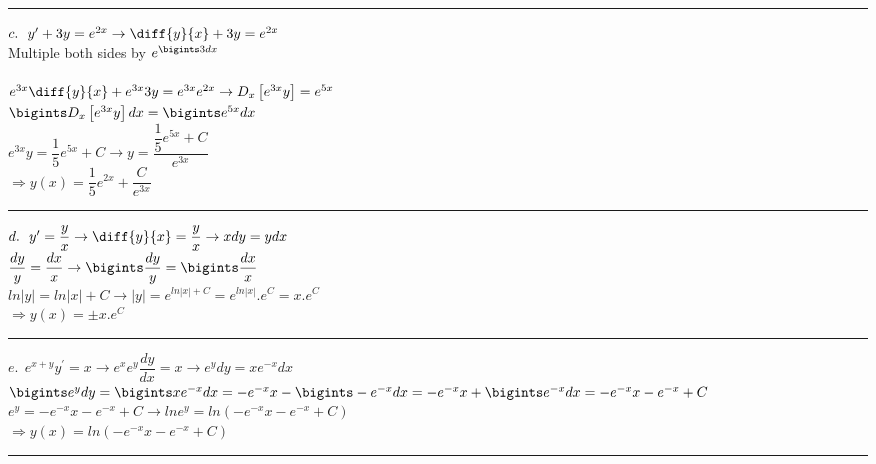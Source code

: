 \documentclass[fleqn]{article}
\begin{document}
\begin{enumerate}
      \textcolor{hwColor}{  
        \rule{15cm}{0.4pt}  
      } 

      \textcolor{hwColor}{ 
        $c. ~~ y^{\prime}+3y=e^{2x} \rightarrow \diff{y}{x}+3y=e^{2x}$ \\
        Multiple both sides by $e^{\bigints 3dx}$ \\
        \\
        $e^{3x}\diff{y}{x}+e^{3x}3y=e^{3x} e^{2x} \rightarrow D_x\left[e^{3x}y\right]=e^{5x}$ \\
        $\bigints D_x\left[e^{3x}y\right]dx=\bigints e^{5x}dx$ \\
        $e^{3x}y=\dfrac{1}{5}e^{5x}+C \rightarrow y=\dfrac{\dfrac{1}{5}e^{5x}+C}{e^{3x}}$ \\
        $\Longrightarrow y(x)=\dfrac{1}{5}e^{2x}+\dfrac{C}{e^{3x}}$
      }

      \textcolor{hwColor}{  
        \rule{15cm}{0.4pt}  
      }

      \textcolor{hwColor}{ 
        $d. ~~ y^{\prime}=\dfrac{y}{x} \rightarrow \diff{y}{x}=\dfrac{y}{x} \rightarrow xdy=ydx$ \\
        $\dfrac{dy}{y}=\dfrac{dx}{x} \rightarrow \bigints \dfrac{dy}{y}=\bigints \dfrac{dx}{x}$ \\
        $ln|y|=ln|x|+C \rightarrow |y|=e^{ln|x|+C}=e^{ln|x|}.e^{C}=x.e^C$ \\
        $\Longrightarrow y(x)=\pm x.e^{C}$
      }

      \textcolor{hwColor}{  
        \rule{15cm}{0.4pt}  
      }

      \textcolor{hwColor}{ 
        $e. ~~ e^{x+y}y^{\prime}=x \rightarrow e^xe^y \dfrac{dy}{dx}=x \rightarrow e^ydy=xe^{-x}dx$ \\
        $\bigints e^ydy=\bigints xe^{-x}dx=-e^{-x}x-\bigints -e^{-x}dx=-e^{-x}x+\bigints e^{-x}dx=-e^{-x}x-e^{-x}+C$ \\
        $e^y=-e^{-x}x-e^{-x}+C \rightarrow lne^y=ln(-e^{-x}x-e^{-x}+C)$ \\
        $\Longrightarrow y(x)=ln(-e^{-x}x-e^{-x}+C)$
      }

      \textcolor{hwColor}{  
        \rule{15cm}{0.4pt}  
      }


\end{enumerate}
\end{document}

